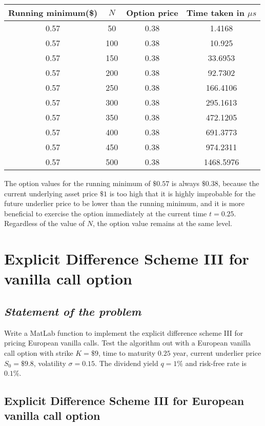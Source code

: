 \begin{center}
	\begin{tabular}{| c | c | c | c |}
		\hline Running minimum(\$) & $N$ & Option price & Time taken in $\mu s$\\
		[0.5ex]
		\hline 0.57 & 50 & 0.38 & 1.4168 \\
		\hline 0.57 & 100 & 0.38 & 10.925 \\
		\hline 0.57 & 150 & 0.38 & 33.6953 \\
		\hline 0.57 & 200 & 0.38 & 92.7302 \\
		\hline 0.57 & 250 & 0.38 & 166.4106 \\
		\hline 0.57 & 300 & 0.38 & 295.1613 \\
		\hline 0.57 & 350 & 0.38 & 472.1205 \\
		\hline 0.57 & 400 & 0.38 & 691.3773 \\
		\hline 0.57 & 450 & 0.38 & 974.2311 \\
		\hline 0.57 & 500 & 0.38 & 1468.5976 \\
		\hline
	\end{tabular}
\end{center}

The option values for the running minimum of $\$0.57$ is always $\$0.38$, because the current underlying asset price $\$1$ is too high that it is highly improbable for the future underlier price to be lower than the running minimum, and it is more beneficial to exercise the option immediately at the current time $t = 0.25$. Regardless of the value of $N$, the option value remains at the same level.

\section{Explicit Difference Scheme III for vanilla call option}
\subsection*{\emph{Statement of the problem}}
Write a MatLab function to implement the explicit difference scheme III for pricing European vanilla calls. Test the algorithm out with a European vanilla call option with strike $K = \$9$, time to maturity $0.25$ year, current underlier price $S_0 = \$9.8$, volatility $\sigma=0.15$. The dividend yield $q = 1\%$ and risk-free rate is $0.1\%$.

\subsection{Explicit Difference Scheme III for European vanilla call option}

